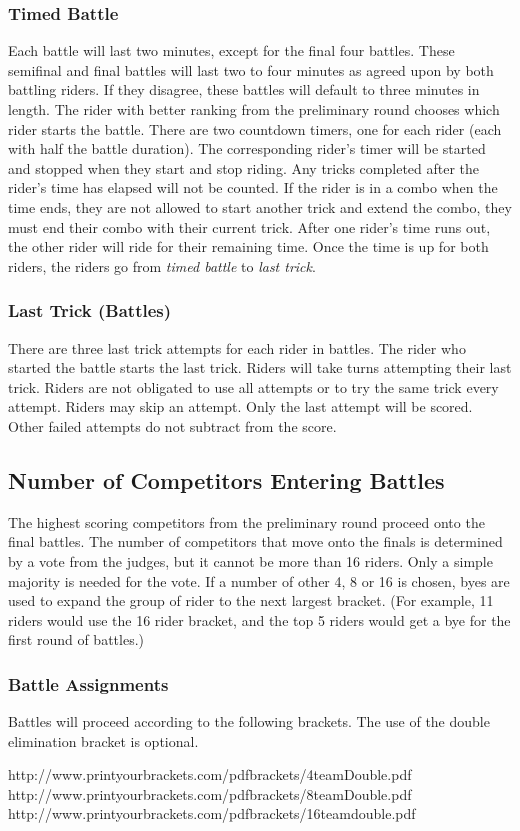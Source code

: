 \subsubsection{Timed Battle}
Each battle will last two minutes, except for the final four battles.
These semifinal and final battles will last two to four minutes as agreed upon by both battling riders.
If they disagree, these battles will default to three minutes in length.
The rider with better ranking from the preliminary round chooses which rider starts the battle.
There are two countdown timers, one for each rider (each with half the battle duration).
The corresponding rider's timer will be started and stopped when they start and stop riding.
Any tricks completed after the rider's time has elapsed will not be counted.
If the rider is in a combo when the time ends, they are not allowed to start another trick and extend the combo, they must end their combo with their current trick.
After one rider's time runs out, the other rider will ride for their remaining time.
Once the time is up for both riders, the riders go from \textit{timed battle} to \textit{last trick}.

\subsubsection{Last Trick (Battles)}
There are three last trick attempts for each rider in battles.
The rider who started the battle starts the last trick.
Riders will take turns attempting their last trick.
Riders are not obligated to use all attempts or to try the same trick every attempt.
Riders may skip an attempt.
Only the last attempt will be scored.
Other failed attempts do not subtract from the score.

\subsection{Number of Competitors Entering Battles}
The highest scoring competitors from the preliminary round proceed onto the final battles.
The number of competitors that move onto the finals is determined by a vote from the judges, but it cannot be more than 16 riders.
Only a simple majority is needed for the vote.
If a number of other 4, 8 or 16 is chosen, byes are used to expand the group of rider to the next largest bracket.
(For example, 11 riders would use the 16 rider bracket, and the top 5 riders would get a bye for the first round of battles.)

\subsubsection{Battle Assignments}
Battles will proceed according to the following brackets.
The use of the double elimination bracket is optional.

http://www.printyourbrackets.com/pdfbrackets/4teamDouble.pdf \\
http://www.printyourbrackets.com/pdfbrackets/8teamDouble.pdf \\
http://www.printyourbrackets.com/pdfbrackets/16teamdouble.pdf
